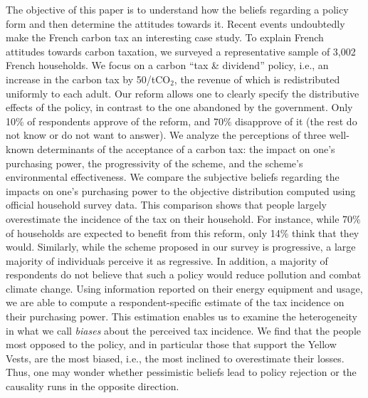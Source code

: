 \documentclass[12pt]{article} %
\begin{document}
The objective of this paper is to understand how the beliefs regarding a policy form and then determine the attitudes towards it. Recent events undoubtedly make the French carbon tax an interesting case study. To explain French attitudes towards carbon taxation, we surveyed a representative sample of 3,002 French households. We focus on a carbon ``tax \& dividend'' policy, i.e., an increase in the carbon tax by 50\euros{}/t$\text{CO}_{2}$, the revenue of which is redistributed uniformly to each adult. Our reform allows one to clearly specify the distributive effects of the policy, in contrast to the one abandoned by the government. Only 10\% of respondents approve of the reform, and 70\% disapprove of it (the rest do not know or do not want to answer). We analyze the perceptions of three well-known determinants of the acceptance of a carbon tax: the impact on one's purchasing power, the progressivity of the scheme, and the scheme’s environmental effectiveness. We compare the subjective beliefs regarding the impacts on one's purchasing power to the objective distribution computed using official household survey data. This comparison shows that people largely overestimate the incidence of the tax on their household. For instance, while 70\% of households are expected to benefit from this reform, only 14\% think that they would. Similarly, while the scheme proposed in our survey is progressive, a large majority of individuals perceive it as regressive. In addition, a majority of respondents do not believe that such a policy would reduce pollution and combat climate change. Using information reported on their energy equipment and usage, we are able to compute a respondent-specific estimate of the tax incidence on their purchasing power. This estimation enables us to examine the heterogeneity in what we call \textit{biases} about the perceived tax incidence. We find that the people most opposed to the policy, and in particular those that support the Yellow Vests, are the most biased, i.e., the most inclined to overestimate their losses. Thus, one may wonder whether pessimistic beliefs lead to policy rejection or the causality runs in the opposite direction.

\end{document}
